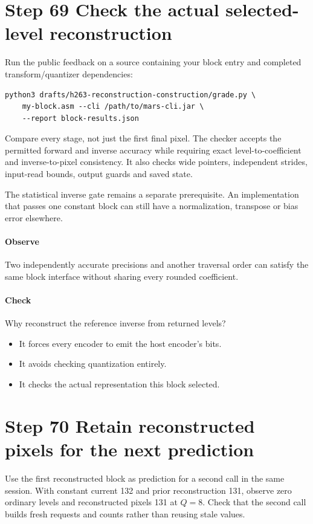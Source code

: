 \section{Step 69 Check the actual selected-level reconstruction}\label{h263-block-s09}
Run the public feedback on a source containing your block entry and completed
transform/quantizer dependencies:
\begin{verbatim}
python3 drafts/h263-reconstruction-construction/grade.py \
    my-block.asm --cli /path/to/mars-cli.jar \
    --report block-results.json
\end{verbatim}
Compare every stage, not just the first final pixel. The checker accepts the
permitted forward and inverse accuracy while requiring exact level-to-coefficient
and inverse-to-pixel consistency. It also checks wide pointers, independent
strides, input-read bounds, output guards and saved state.

The statistical inverse gate remains a separate prerequisite. An implementation
that passes one constant block can still have a normalization, transpose or bias
error elsewhere.

\paragraph{Observe} Two independently accurate precisions and another traversal
order can satisfy the same block interface without sharing every rounded coefficient.
\Needspace{8\baselineskip}
\paragraph{Check} Why reconstruct the reference inverse from returned levels?
\begin{itemize}
  \item[A.] It forces every encoder to emit the host encoder's bits.
  \item[B.] It avoids checking quantization entirely.
  \item[C.] It checks the actual representation this block selected.
\end{itemize}

\section{Step 70 Retain reconstructed pixels for the next prediction}\label{h263-block-s10}
Use the first reconstructed block as prediction for a second call in the same
session. With constant current 132 and prior reconstruction 131, observe zero
ordinary levels and reconstructed pixels 131 at $Q=8$. Check that the second
call builds fresh requests and counts rather than reusing stale values.

